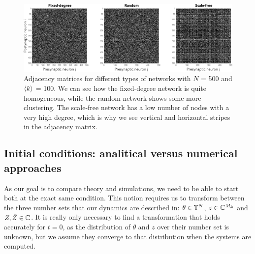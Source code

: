 \begin{figure}[H]
\centering
\includegraphics[width = \textwidth]{../Figures/Adjacency_matrices.pdf}
   \caption{Adjacency matrices for different types of networks with $N$ = 500 and ${\langle k\rangle}$ = 100. We can see how the fixed-degree network is quite homogeneous, while the random network shows some more clustering. The scale-free network has a low number of nodes with a very high degree, which is why we see vertical and horizontal stripes in the adjacency matrix.}
   \label{fig:adjacencymatrices}
\end{figure}



\subsection{Initial conditions: analitical versus numerical approaches} \label{sec:initialconditions}
As our goal is to compare theory and simulations, we need to be able to start both at the exact same condition. This notion requires us to transform between the three number sets that our dynamics are described in: $\theta \in {\mathbb{T}}^N$, $z \in {\mathbb{C}}^{M_{{\boldsymbol{k}}}}$ and $Z, \bar{Z} \in {\mathbb{C}}$. It is really only necessary to find a transformation that holds accurately for $t=0$, as the distribution of $\theta$ and $z$ over their number set is unknown, but we assume they converge to that distribution when the systems are computed.



